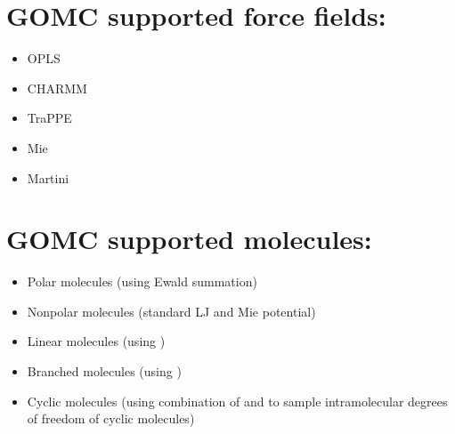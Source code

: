 \documentclass[letterpaper,10pt,english]{sphinxmanual}
\begin{document}
\section{GOMC supported force fields:}
\label{\detokenize{introduction:gomc-supported-force-fields}}\begin{itemize}
\item {} 
OPLS

\item {} 
CHARMM

\item {} 
TraPPE

\item {} 
Mie

\item {} 
Martini

\end{itemize}


\section{GOMC supported molecules:}
\label{\detokenize{introduction:gomc-supported-molecules}}\begin{itemize}
\item {} 
Polar molecules (using Ewald summation)

\item {} 
Non\sphinxhyphen{}polar molecules (standard LJ and Mie potential)

\item {} 
Linear molecules (using )

\item {} 
Branched molecules (using )

\item {} 
Cyclic molecules (using combination of  and  to sample intramolecular degrees of freedom of cyclic molecules)

\end{itemize}
\end{document}
